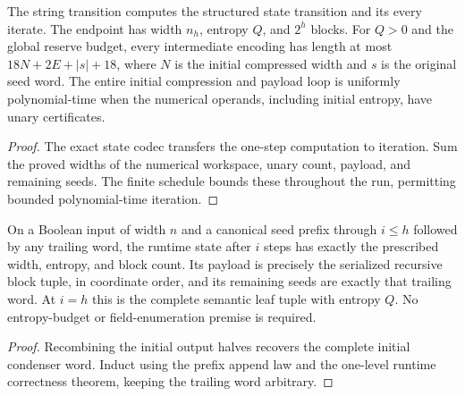 \begin{theorem}
  \label{thm:lowerbounds-algebraic-scheduled-run}
  \leanok
  The string transition computes the structured state transition and its
  every iterate. The endpoint has width $n_h$, entropy $Q$, and $2^h$
  blocks. For $Q>0$ and the global reserve budget, every intermediate
  encoding has length at most $18N+2E+|s|+18$, where $N$ is the initial
  compressed width and $s$ is the original seed word. The entire initial
  compression and payload loop is uniformly polynomial-time when the
  numerical operands, including initial entropy, have unary certificates.
\end{theorem}
\begin{proof}
  \leanok
  The exact state codec transfers the one-step computation to iteration.
  Sum the proved widths of the numerical workspace, unary count, payload,
  and remaining seeds. The finite schedule bounds these throughout the
  run, permitting bounded polynomial-time iteration.
\end{proof}

\begin{theorem}
  \label{thm:lowerbounds-algebraic-scheduled-run-correctness}
  \leanok
  On a Boolean input of width $n$ and a canonical seed prefix through
  $i\le h$ followed by any trailing word, the runtime state after $i$
  steps has exactly the prescribed width, entropy, and block count.
  Its payload is precisely the serialized recursive block tuple, in
  coordinate order, and its remaining seeds are exactly that trailing word.
  At $i=h$ this is the complete semantic leaf tuple with entropy $Q$.
  No entropy-budget or field-enumeration premise is required.
\end{theorem}
\begin{proof}
  \leanok
  Recombining the initial output halves recovers the complete initial
  condenser word. Induct using the prefix append law and the one-level
  runtime correctness theorem, keeping the trailing word arbitrary.
\end{proof}

